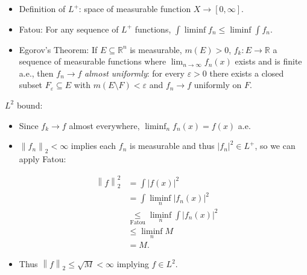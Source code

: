 \begin{solution}

\hfill

\begin{concept}

\hfill

\begin{itemize}
\tightlist
\item
  Definition of \(L^+\): space of measurable function
  \(X\to [0, \infty]\).
\item
  Fatou: For any sequence of \(L^+\) functions,
  \(\int \liminf f_n \leq \liminf \int f_n\).
\item
  Egorov's Theorem: If \(E\subseteq {\mathbb{R}}^n\) is measurable,
  \(m(E) > 0\), \(f_k:E\to {\mathbb{R}}\) a sequence of measurable
  functions where \(\lim_{n\to\infty} f_n(x)\) exists and is finite
  a.e., then \(f_n\to f\) \emph{almost uniformly}: for every
  \(\varepsilon>0\) there exists a closed subset
  \(F_\varepsilon\subseteq E\) with \(m(E\setminus F) < \varepsilon\)
  and \(f_n\to f\) uniformly on \(F\).
\end{itemize}

\end{concept}

\(L^2\) bound:

\begin{itemize}
\tightlist
\item
  Since \(f_k \to f\) almost everywhere, \(\liminf_n f_n(x) = f(x)\)
  a.e.
\item
  \({\left\lVert {f_n} \right\rVert}_2 < \infty\) implies each \(f_n\)
  is measurable and thus \({\left\lvert {f_n} \right\rvert}^2 \in L^+\),
  so we can apply Fatou:
\end{itemize}

\begin{align*}
{\left\lVert {f} \right\rVert}_2^2
&= \int {\left\lvert {f(x)} \right\rvert}^2  \\
&= \int \liminf_n {\left\lvert {f_n(x)} \right\rvert}^2 \\
&\underset{\text{Fatou}}\leq\liminf_n \int {\left\lvert {f_n(x)} \right\rvert}^2 \\
&\leq \liminf_n M \\
&= M
.\end{align*}

\begin{itemize}
\tightlist
\item
  Thus \({\left\lVert {f} \right\rVert}_2 \leq \sqrt{M} < \infty\)
  implying \(f\in L^2\).
\end{itemize}


\end{solution}

